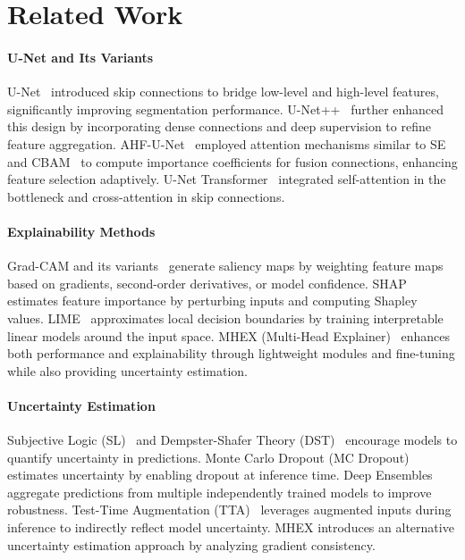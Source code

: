 \section{Related Work}
\paragraph{U-Net and Its Variants}  
U-Net~\cite{unet} introduced skip connections to bridge low-level and high-level features, significantly improving segmentation performance. U-Net++~\cite{unet++} further enhanced this design by incorporating dense connections and deep supervision to refine feature aggregation. AHF-U-Net~\cite{AHF-U-Net} employed attention mechanisms similar to SE~\cite{hu2018squeeze} and CBAM~\cite{woo2018cbam} to compute importance coefficients for fusion connections, enhancing feature selection adaptively. U-Net Transformer~\cite{U-NetTransformer} integrated self-attention in the bottleneck and cross-attention in skip connections.

\paragraph{Explainability Methods}  
Grad-CAM and its variants~\cite{wang2020score,chattopadhay2018grad,selvaraju2017grad} generate saliency maps by weighting feature maps based on gradients, second-order derivatives, or model confidence. SHAP~\cite{lundberg2017unified} estimates feature importance by perturbing inputs and computing Shapley values. LIME~\cite{ribeiro2016whyitrustyou} approximates local decision boundaries by training interpretable linear models around the input space. MHEX (Multi-Head Explainer)~\cite{mhex} enhances both performance and explainability through lightweight modules and fine-tuning while also providing uncertainty estimation.  

\paragraph{Uncertainty Estimation}  
Subjective Logic (SL)~\cite{subjectiveLogic} and Dempster-Shafer Theory (DST)~\cite{DempsterShafer} encourage models to quantify uncertainty in predictions. Monte Carlo Dropout (MC Dropout)~\cite{gal2016dropout} estimates uncertainty by enabling dropout at inference time. Deep Ensembles~\cite{lakshminarayanan2017simplescalablepredictiveuncertainty} aggregate predictions from multiple independently trained models to improve robustness. Test-Time Augmentation (TTA)~\cite{TTA} leverages augmented inputs during inference to indirectly reflect model uncertainty. MHEX\cite{mhex} introduces an alternative uncertainty estimation approach by analyzing gradient consistency.